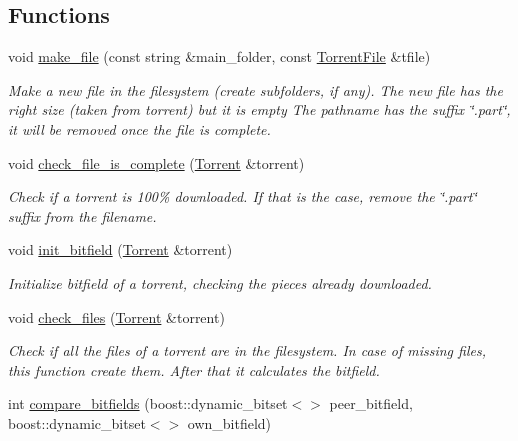 \subsection*{Functions}
\begin{DoxyCompactItemize}
\item 
void \hyperlink{namespacefileio_a2c09e8f358ac78b947433b69afa0c277}{make\+\_\+file} (const string \&main\+\_\+folder, const \hyperlink{structtorr_1_1TorrentFile}{Torrent\+File} \&tfile)
\begin{DoxyCompactList}\small\item\em Make a new file in the filesystem (create subfolders, if any). The new file has the right size (taken from torrent) but it is empty The pathname has the suffix \char`\"{}.\+part\char`\"{}, it will be removed once the file is complete. \end{DoxyCompactList}\item 
void \hyperlink{namespacefileio_ae9adface3fdec7387d6d5cf00ff1d4d1}{check\+\_\+file\+\_\+is\+\_\+complete} (\hyperlink{structtorr_1_1Torrent}{Torrent} \&torrent)
\begin{DoxyCompactList}\small\item\em Check if a torrent is 100\% downloaded. If that is the case, remove the \char`\"{}.\+part\char`\"{} suffix from the filename. \end{DoxyCompactList}\item 
void \hyperlink{namespacefileio_a7f1110f96a3deb25d8d75ff0ada7d040}{init\+\_\+bitfield} (\hyperlink{structtorr_1_1Torrent}{Torrent} \&torrent)
\begin{DoxyCompactList}\small\item\em Initialize bitfield of a torrent, checking the pieces already downloaded. \end{DoxyCompactList}\item 
void \hyperlink{namespacefileio_a2caefabab7dfb9c7ad57620a998a5541}{check\+\_\+files} (\hyperlink{structtorr_1_1Torrent}{Torrent} \&torrent)
\begin{DoxyCompactList}\small\item\em Check if all the files of a torrent are in the filesystem. In case of missing files, this function create them. After that it calculates the bitfield. \end{DoxyCompactList}\item 
int \hyperlink{namespacefileio_ae4d75e087ce78d860bef69df48a32798}{compare\+\_\+bitfields} (boost\+::dynamic\+\_\+bitset$<$$>$ peer\+\_\+bitfield, boost\+::dynamic\+\_\+bitset$<$$>$ own\+\_\+bitfield)

\end{DoxyCompactItemize}
